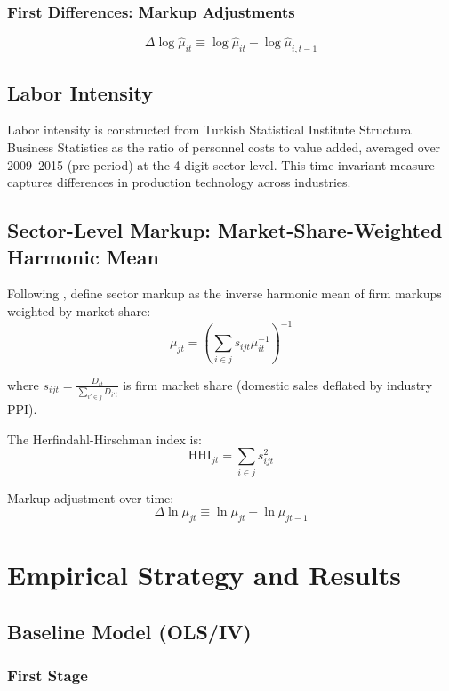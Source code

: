 \documentclass[12pt]{article}
\begin{document}
\subsubsection{First Differences: Markup Adjustments}

\[
\Delta \log \hat{\mu}_{it} \equiv \log \hat{\mu}_{it} - \log \hat{\mu}_{i,t-1}
\]

\subsection{Labor Intensity}

Labor intensity is constructed from Turkish Statistical Institute Structural Business Statistics as the ratio of personnel costs to value added, averaged over 2009--2015 (pre-period) at the 4-digit sector level. This time-invariant measure captures differences in production technology across industries.

\subsection{Sector-Level Markup: Market-Share-Weighted Harmonic Mean}

Following \cite{bursteinBottomUpMarkupFluctuations2025}, define sector markup as the inverse harmonic mean of firm markups weighted by market share:
\[
\mu_{jt} = \left( \sum_{i \in j} s_{ijt} \mu_{it}^{-1} \right)^{-1}
\]

where $s_{ijt} = \frac{D_{it}}{\sum_{i' \in j} D_{i't}}$ is firm market share (domestic sales deflated by industry PPI).

The Herfindahl-Hirschman index is:
\[
\text{HHI}_{jt} = \sum_{i \in j} s_{ijt}^2
\]

Markup adjustment over time:
\[
\Delta \ln \mu_{jt} \equiv \ln \mu_{jt} - \ln \mu_{jt-1}
\]

\section{Empirical Strategy and Results}

\subsection{Baseline Model (OLS/IV)}

\subsubsection{First Stage}
\end{document}
